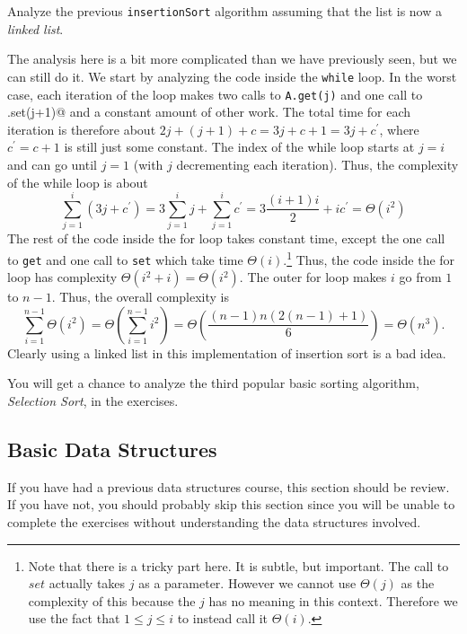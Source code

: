 \begin{exa}
Analyze the previous \verb+insertionSort+ algorithm assuming that the
list is now a {\em linked list}. 
\begin{sol}
The analysis here is a bit more complicated than we have previously seen, but we can still do it.
We start by analyzing the code inside the \verb+while+ loop.
In the worst case, each iteration of the loop makes two calls to \verb+A.get(j)+
and one call to \verb@A.set(j+1)@ and a constant amount of other work.  The total time for each iteration is therefore
about $2j+(j+1)+c=3j+c+1=3j+c^{\prime}$, where $c^{\prime}=c+1$ is still just some constant.  
The index of the while loop starts at $j=i$ and can go until
$j=1$ (with $j$ decrementing each iteration).  Thus, the complexity of the while loop
is about
$$\sum_{j=1}^{i}(3j+c^{\prime} )
= 3\sum_{j=1}^{i}j + \sum_{j=1}^{i} c^{\prime} 
=3\frac{(i+1)i}{2} +ic^{\prime} =\Theta(i^2)$$
The rest of the code inside the for loop takes constant time, except
the one call to \verb+get+ and one call to \verb+set+ which take time
$\Theta(i)$.\footnote{Note that there is a tricky part here.  It is subtle, but important.
The call to $set$ actually takes $j$ as a parameter.  However we cannot
use $\Theta(j)$ as the complexity of this because the $j$ has no meaning in this
context.  Therefore we use the fact that $1\leq j \leq i$ to instead call it
$\Theta(i)$.}
Thus, the code inside the for loop has complexity
$\Theta(i^2+i)=\Theta(i^2)$.
The outer for loop makes $i$  go from $1$ to $n-1$.
Thus, the overall complexity is 
$$\sum_{i=1}^{n-1}\Theta(i^2)
=\Theta\left(\sum_{i=1}^{n-1}i^2\right)
=\Theta\left(\frac{(n-1)n(2(n-1)+1)}{6}\right)
=\Theta(n^3).
$$
Clearly using a linked list in this implementation of insertion sort is a bad idea. 
\end{sol}
\end{exa}

You will get a chance to analyze the third popular basic sorting algorithm, {\em Selection Sort}, in the exercises.


\subsection{Basic Data Structures}\label{subsec:BDS}
If you have had a previous data structures course, this section should be review.
If you have not, you should probably skip this section since you will be unable to
complete the exercises without understanding the data structures involved.

